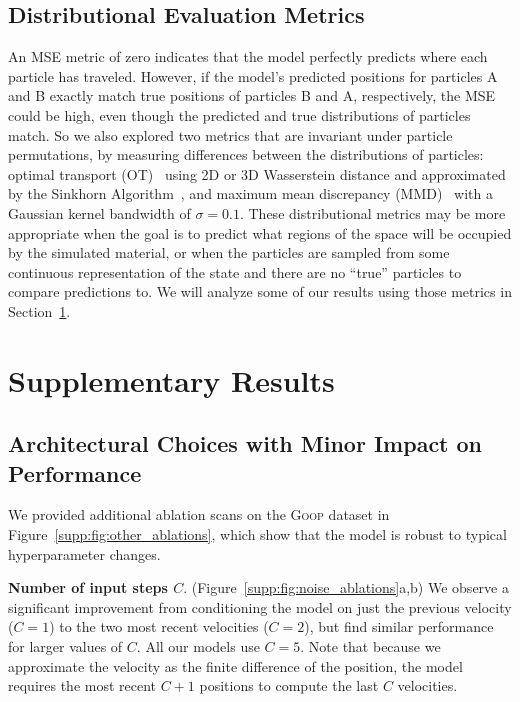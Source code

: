 \documentclass{article}
\newcommand{\xhdr}[1]{{\noindent\bfseries #1}.}
\newcommand\figref[1]{Figure~\ref{#1}}
\newcommand\domain[1]{\textsc{#1}}
\begin{document}
\subsection{Distributional Evaluation Metrics}
An MSE metric of zero indicates that the model perfectly predicts where each particle has traveled. However, if the model's predicted positions for particles A and B exactly match true positions of particles B and A, respectively, the MSE could be high, even though the predicted and true distributions of particles match. So we also explored two metrics that are invariant under particle permutations, by measuring differences between the distributions of particles: optimal transport (OT)~\cite{villani2003topics} using 2D or 3D Wasserstein distance and approximated by the Sinkhorn Algorithm~\cite{cuturi2013sinkhorn}, and maximum mean discrepancy (MMD)~\cite{gretton2012kernel} with a Gaussian kernel bandwidth of ${\sigma = 0.1}$. These distributional metrics may be more appropriate when the goal is to predict what regions of the space will be occupied by the simulated material, or when the particles are sampled from some continuous representation of the state and there are no ``true'' particles to compare predictions to. We will analyze some of our results using those metrics in Section~\ref{supp:sec:results}.



\section{Supplementary Results}
\label{supp:sec:results}

\subsection{Architectural Choices with Minor Impact on Performance} 
%

We provided additional ablation scans on the \domain{Goop} dataset in \figref{supp:fig:other_ablations}, which show that the model is robust to typical hyperparameter changes.

\xhdr{Number of input steps $C$}
(\figref{supp:fig:noise_ablations}a,b) We observe a significant improvement from conditioning the model on just the previous velocity ($C=1$) to the two most recent velocities ($C=2$), but find similar performance for larger values of $C$. All our models use $C=5$. Note that because we approximate the velocity as the finite difference of the position, the model requires the most recent $C+1$ positions to compute the last $C$ velocities.
\end{document}
